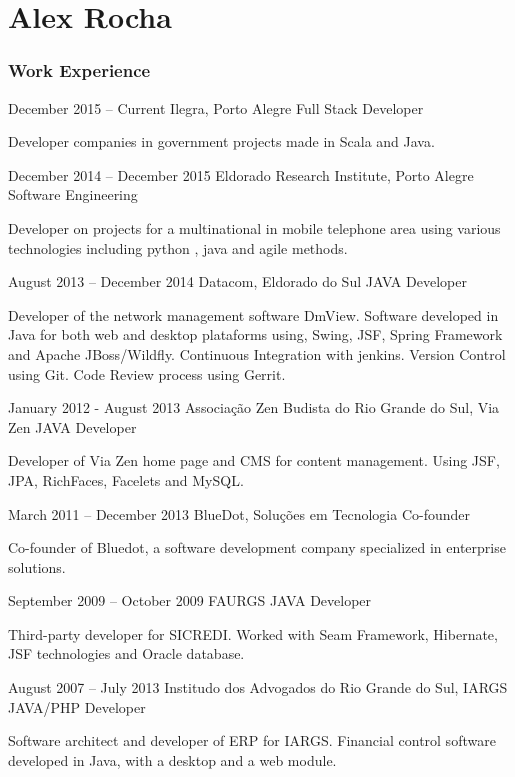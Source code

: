 \documentclass{tccv}
\begin{document}
\part{Alex Rocha}

\section{Work Experience}

\begin{eventlist}

\item{December 2015 -- Current}
    {Ilegra, Porto Alegre}
    {Full Stack Developer}

    Developer companies in government projects made in Scala and Java.

\item{December 2014 -- December 2015}
    {Eldorado Research Institute, Porto Alegre}
    {Software Engineering}

    Developer on projects for a multinational in mobile telephone area using various technologies including python , java and agile methods.

\item{August 2013 -- December 2014}
    {Datacom, Eldorado do Sul}
    {JAVA Developer}

    Developer of the network management software DmView.
    Software developed in Java for both web and desktop plataforms using, Swing, JSF, Spring Framework and Apache JBoss/Wildfly.
    Continuous Integration with jenkins. Version Control using Git. Code Review process using
    Gerrit.

\item{January 2012 - August 2013}
    {Associação Zen Budista do Rio Grande do Sul, Via Zen}
    {JAVA Developer}

    Developer of Via Zen home page and CMS for content management. Using JSF, JPA, RichFaces, Facelets and MySQL.

\item{March 2011 -- December 2013}
    {BlueDot, Soluções em Tecnologia}
    {Co-founder}

    Co-founder of Bluedot, a software development company specialized in enterprise solutions.

\item{September 2009 -- October 2009}
    {FAURGS}
    {JAVA Developer}

    Third-party developer for SICREDI\@. Worked with Seam Framework, Hibernate, JSF technologies and Oracle
    database.

\item{August 2007 -- July 2013}
    {Institudo dos Advogados do Rio Grande do Sul, IARGS}
    {JAVA/PHP Developer}

    Software architect and developer of ERP for IARGS\@.
    Financial control software developed in Java, with a desktop and a web module.

\end{eventlist}
\end{document}

